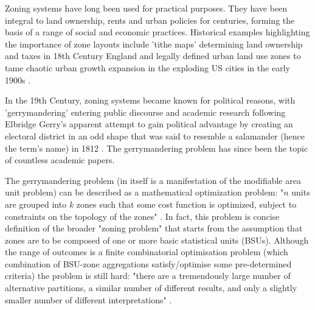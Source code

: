 \documentclass{josis}
\begin{document}
Zoning systems have long been used for practical purposes.
They have been integral to land ownership, rents and urban policies for centuries, forming the basis of a range of social and economic practices.
Historical examples highlighting the importance of zone layouts include 'tithe maps' determining land ownership and taxes in 18th Century England \cite{bryant_worcestershire_2007} and legally defined urban land use zones to tame chaotic urban growth expansion in the exploding US cities in the early 1900s \cite{baker_zoning_1925}.

In the 19th Century, zoning systems became known for political reasons, with 'gerrymandering' entering public discourse and academic research following Elbridge Gerry's apparent attempt to gain political advantage by creating an electoral district in an odd shape that was said to resemble a salamander (hence the term's name) in 1812  \cite{orr_persistence_1969}.
The gerrymandering problem has since been the topic of countless academic papers.

The gerrymandering problem (in itself is a manifestation of the modifiable area unit problem) can be described as a mathematical optimization problem: "$n$ units are grouped into $k$ zones such that some cost function is optimized, subject to constraints on the topology of the zones" \cite{chou_taming_2006}.
In fact, this problem is concise definition of the broader "zoning problem" that starts from the assumption that zones are to be composed of one or more basic statistical units (BSUs).
Although the range of outcomes is a finite combinatorial optimisation problem (which combination of BSU-zone aggregations satisfy/optimise some pre-determined criteria) the problem is still hard:
"there are a tremendously large number of alternative partitions, a similar number of different results, and only a slightly smaller number of different interpretations" \cite{openshaw_optimal_1977}.
\end{document}
